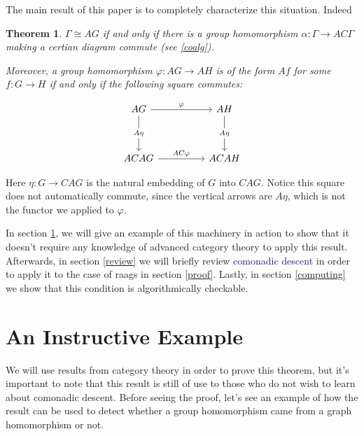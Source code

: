 \documentclass[12pt]{article}
\newtheorem{thm}{Theorem}
\theoremstyle{definition}
\theoremstyle{theorem}
\newcommand*{\important}[1]{\textcolor{MidnightBlue}{#1}}
\begin{document}
    The main result of this paper is to completely characterize this situation.
    Indeed

    \begin{thm}
        $\Gamma \cong AG$ if and only if there is a group homomorphism 
        $\alpha : \Gamma \to AC\Gamma$ making a certian diagram 
        commute (see \ref{coalg}).

        Moreover, a group homomorphism $\varphi : AG \to AH$ is of the form
        $Af$ for some $f : G \to H$ if and only if the following square commutes:

        \[
            \begin{tikzcd}
            AG && AH \\
            \\
            ACAG && ACAH
            \arrow["\varphi", from=1-1, to=1-3]
            \arrow["AC\varphi", from=3-1, to=3-3]
            \arrow["{A \eta}"{description}, from=1-1, to=3-1]
            \arrow["A\eta"{description}, from=1-3, to=3-3]
            \end{tikzcd}
        \]
    \end{thm}

    Here $\eta : G \to CAG$ is the natural embedding of $G$ into $CAG$.
    Notice this square does not automatically commute, since the vertical
    arrows are $A \eta$, which is not the functor we applied to $\varphi$.

    In section \ref{eg}, we will give an example of this machinery in action
    to show that it doesn't require any knowledge of advanced category theory
    to apply this result. Afterwards, in section \ref{review} 
    we will briefly review \important{comonadic descent} in order to apply it
    to the case of raags in section \ref{proof}. Lastly, in section \ref{computing}
    we show that this condition is algorithmically checkable. 




\section{An Instructive Example}
\label{eg}

We will use results from category theory in order to prove this theorem,
but it's important to note that this result is still of use to those who 
do not wish to learn about comonadic descent. Before seeing the proof,
let's see an example of how the result can be used to detect whether a group 
homomorphism came from a graph homomorphism or not.
\end{document}
